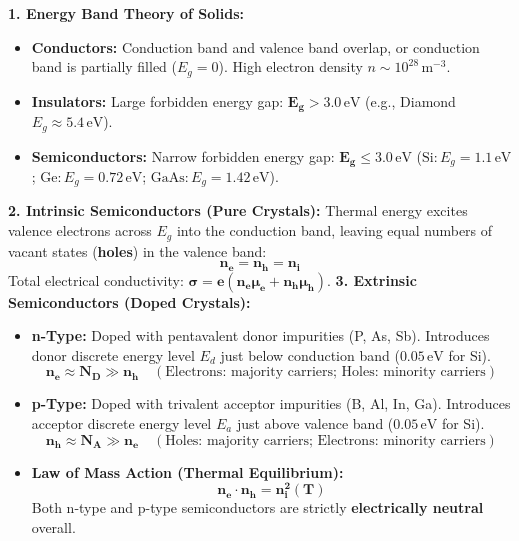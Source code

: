 \documentclass[10pt,a4paper]{article}
\begin{document}
\begin{conceptbox}
\textbf{1. Energy Band Theory of Solids:}
\begin{itemize}
  \item \textbf{Conductors:} Conduction band and valence band overlap, or conduction band is partially filled ($E_g = 0$). High electron density $n \sim 10^{28}\,\mathrm{m}^{-3}$.
  \item \textbf{Insulators:} Large forbidden energy gap: $\mathbf{E_g > 3.0\,\mathrm{eV}}$ (e.g., Diamond $E_g \approx 5.4\,\mathrm{eV}$).
  \item \textbf{Semiconductors:} Narrow forbidden energy gap: $\mathbf{E_g \le 3.0\,\mathrm{eV}}$ ($\mathrm{Si}: E_g = 1.1\,\mathrm{eV}$; $\mathrm{Ge}: E_g = 0.72\,\mathrm{eV}$; $\mathrm{GaAs}: E_g = 1.42\,\mathrm{eV}$).
\end{itemize}
\textbf{2. Intrinsic Semiconductors (Pure Crystals):}
Thermal energy excites valence electrons across $E_g$ into the conduction band, leaving equal numbers of vacant states (\textbf{holes}) in the valence band:
\begin{equation}
  \mathbf{n_e = n_h = n_i}
\end{equation}
Total electrical conductivity: $\mathbf{\sigma = e(n_e \mu_e + n_h \mu_h)}$.
\textbf{3. Extrinsic Semiconductors (Doped Crystals):}
\begin{itemize}
  \item \textbf{n-Type:} Doped with pentavalent donor impurities (P, As, Sb). Introduces donor discrete energy level $E_d$ just below conduction band ($0.05\,\mathrm{eV}$ for Si).
  \begin{equation}
    \mathbf{n_e \approx N_D \gg n_h} \quad (\text{Electrons: majority carriers; Holes: minority carriers})
  \end{equation}
  \item \textbf{p-Type:} Doped with trivalent acceptor impurities (B, Al, In, Ga). Introduces acceptor discrete energy level $E_a$ just above valence band ($0.05\,\mathrm{eV}$ for Si).
  \begin{equation}
    \mathbf{n_h \approx N_A \gg n_e} \quad (\text{Holes: majority carriers; Electrons: minority carriers})
  \end{equation}
  \item \textbf{Law of Mass Action (Thermal Equilibrium):}
  \begin{equation}
    \mathbf{n_e \cdot n_h = n_i^2(T)}
  \end{equation}
  Both n-type and p-type semiconductors are strictly \textbf{electrically neutral} overall.
\end{itemize}
\end{conceptbox}
\end{document}
